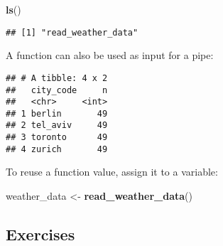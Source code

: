 \documentclass[]{book}
\newenvironment{Shaded}{\begin{snugshade}}{\end{snugshade}}
\newcommand{\KeywordTok}[1]{\textcolor[rgb]{0.13,0.29,0.53}{\textbf{#1}}}
\newcommand{\NormalTok}[1]{#1}
\newcommand{\OperatorTok}[1]{\textcolor[rgb]{0.81,0.36,0.00}{\textbf{#1}}}
\newcommand{\StringTok}[1]{\textcolor[rgb]{0.31,0.60,0.02}{#1}}
\begin{document}
\begin{Shaded}
\begin{Highlighting}[]
\KeywordTok{ls}\NormalTok{()}
\end{Highlighting}
\end{Shaded}

\begin{verbatim}
## [1] "read_weather_data"
\end{verbatim}

A function can also be used as input for a pipe:

\begin{Shaded}
\end{Shaded}

\begin{verbatim}
## # A tibble: 4 x 2
##   city_code     n
##   <chr>     <int>
## 1 berlin       49
## 2 tel_aviv     49
## 3 toronto      49
## 4 zurich       49
\end{verbatim}

To reuse a function value, assign it to a variable:

\begin{Shaded}
\begin{Highlighting}[]
\NormalTok{weather_data <-}\StringTok{ }\KeywordTok{read_weather_data}\NormalTok{()}
\end{Highlighting}
\end{Shaded}

\hypertarget{exercises}{%
\subsection{Exercises}\label{exercises}}
\end{document}
